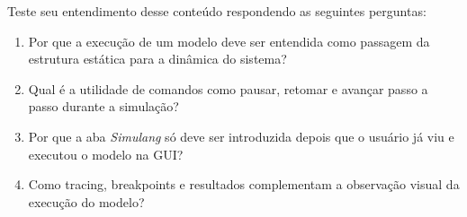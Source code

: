 Teste seu entendimento desse conteúdo respondendo as seguintes perguntas:

\begin{enumerate}
    \item Por que a execução de um modelo deve ser entendida como passagem da estrutura estática para a dinâmica do sistema?

    \item Qual é a utilidade de comandos como pausar, retomar e avançar passo a passo durante a simulação?

    \item Por que a aba \textit{Simulang} só deve ser introduzida depois que o usuário já viu e executou o modelo na GUI?

    \item Como tracing, breakpoints e resultados complementam a observação visual da execução do modelo?
\end{enumerate}